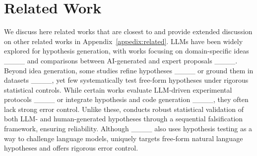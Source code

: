 \section{Related Work}
We discuss here related works that are closest to   \mname and provide extended discussion on other related works in Appendix~\ref{appedix:related}. LLMs have been widely explored for hypothesis generation, with works focusing on domain-specific ideas ____ and comparisons between AI-generated and expert proposals ____. Beyond idea generation, some studies refine hypotheses ____ or ground them in datasets ____, yet few systematically test free-form hypotheses under rigorous statistical controls. While certain works evaluate LLM-driven experimental protocols ____ or integrate hypothesis and code generation ____, they often lack strong error control. Unlike these, \mname conducts robust statistical validation of both LLM- and human-generated hypotheses through a sequential falsification framework, ensuring reliability. Although ____ also uses hypothesis testing as a way to challenge language models, \mname uniquely targets free-form natural language hypotheses and offers rigorous error control.